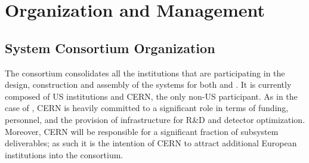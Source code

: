 




\section{Organization and Management}
\label{sec:fdsp-hv-org}


\subsection{ System Consortium Organization}
\label{sec:fdsp-hv-org-consortium}

The consortium consolidates all the institutions that are participating in the design, construction and assembly of the  systems for both   and . It is currently composed of US institutions and CERN, the only non-US participant. As in the case of , CERN is heavily committed to a significant role in terms of funding, personnel, 
 and the provision of infrastructure for R\&D and detector optimization. Moreover, CERN will be responsible for a significant fraction of subsystem deliverables; as such it is the intention of CERN to attract additional European institutions into the consortium.





